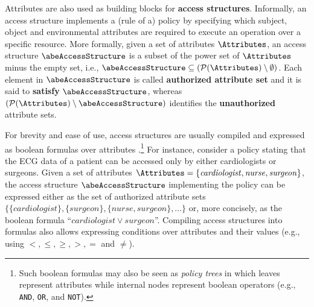 Attributes are also used as building blocks for \textbf{access structures}. Informally, an access structure implements a (rule of a) policy by specifying which subject, object and environmental attributes are required to execute an operation over a specific resource. More formally, given a set of attributes $\Attributes$, an access structure $\abeAccessStructure$ is a subset of the power set of $\Attributes$ minus the empty set, i.e., $\abeAccessStructure \subseteq (\mathcal{P}(\Attributes) \setminus \emptyset)$. Each element in $\abeAccessStructure$ is called \textbf{authorized attribute set} and it is said to \textbf{satisfy} $\abeAccessStructure$, whereas $(\mathcal{P}(\Attributes) \setminus \abeAccessStructure)$ identifies the \textbf{unauthorized} attribute sets. 

For brevity and ease of use, access structures are usually compiled and expressed as boolean formulas over attributes \cite{venema_systematizing_2023}.\footnote{Such boolean formulas may also be seen as \textit{policy trees} in which leaves represent attributes while internal nodes represent boolean operators (e.g., {\tt AND}, {\tt OR}, and {\tt NOT}).} For instance, consider a policy stating that the ECG data of a patient can be accessed only by either cardiologists or surgeons. Given a set of attributes $\Attributes = \{\mathit{cardiologist}, \mathit{nurse}, \mathit{surgeon}\}$, the access structure $\abeAccessStructure$ implementing the policy can be expressed either as the set of authorized attribute sets $\{ \{\mathit{cardiologist}\}, \{\mathit{surgeon}\}, \{\mathit{nurse}, \mathit{surgeon}\}, ... \}$ or, more concisely, as the boolean formula ``$\mathit{cardiologist} \lor \mathit{surgeon}$''. Compiling access structures into formulas also allows expressing conditions over attributes and their values (e.g., using $<, \leq, \ge, >, =$ and $\neq$).

